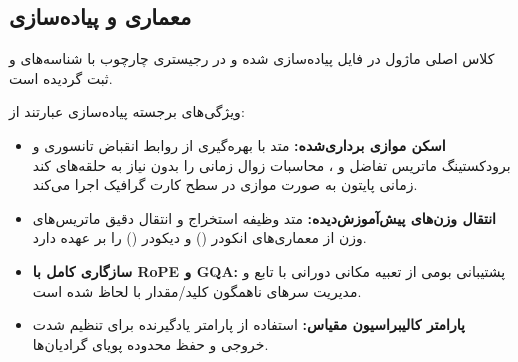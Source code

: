 \subsection{معماری و پیاده‌سازی}
کلاس اصلی ماژول  در فایل  پیاده‌سازی شده و در رجیستری چارچوب با شناسه‌های  و  ثبت گردیده است.

ویژگی‌های برجسته پیاده‌سازی عبارتند از:
\begin{itemize}
    \item \textbf{اسکن موازی برداری‌شده:} متد  با بهره‌گیری از روابط انقباض تانسوری و برودکستینگ ماتریس تفاضل  و ، محاسبات زوال زمانی را بدون نیاز به حلقه‌های کند زمانی پایتون به صورت موازی در سطح کارت گرافیک اجرا می‌کند.
    \item \textbf{انتقال وزن‌های پیش‌آموزش‌دیده:} متد  وظیفه استخراج و انتقال دقیق ماتریس‌های وزن از معماری‌های انکودر () و دیکودر () را بر عهده دارد.
    \item \textbf{سازگاری کامل با RoPE و GQA:} پشتیبانی بومی از تعبیه مکانی دورانی با تابع  و مدیریت سرهای ناهمگون کلید/مقدار با  لحاظ شده است.
    \item \textbf{پارامتر کالیبراسیون مقیاس:} استفاده از پارامتر یادگیرنده  برای تنظیم شدت خروجی و حفظ محدوده پویای گرادیان‌ها.
\end{itemize}
